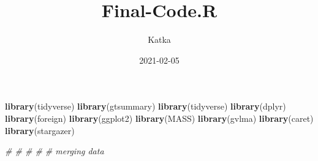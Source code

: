 \documentclass[
]{article}
\title{Final-Code.R}
\author{Katka}
\date{2021-02-05}
\newenvironment{Shaded}{\begin{snugshade}}{\end{snugshade}}
\newcommand{\CommentTok}[1]{\textcolor[rgb]{0.56,0.35,0.01}{\textit{#1}}}
\newcommand{\KeywordTok}[1]{\textcolor[rgb]{0.13,0.29,0.53}{\textbf{#1}}}
\newcommand{\NormalTok}[1]{#1}
\begin{document}
\maketitle

\begin{Shaded}
\begin{Highlighting}[]
\KeywordTok{library}\NormalTok{(tidyverse)}
\KeywordTok{library}\NormalTok{(gtsummary)}
\KeywordTok{library}\NormalTok{(tidyverse)}
\KeywordTok{library}\NormalTok{(dplyr)}
\KeywordTok{library}\NormalTok{(foreign)}
\KeywordTok{library}\NormalTok{(ggplot2)}
\KeywordTok{library}\NormalTok{(MASS)}
\KeywordTok{library}\NormalTok{(gvlma)}
\KeywordTok{library}\NormalTok{(caret)}
\KeywordTok{library}\NormalTok{(stargazer)}


\CommentTok{# # # # # merging data}


\end{Highlighting}
\end{Shaded}
\end{document}
